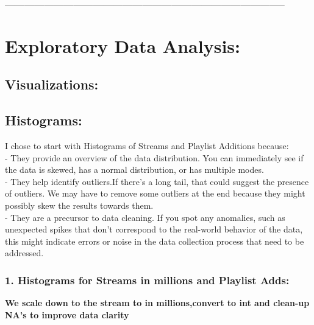 \documentclass[
]{article}
\newenvironment{Shaded}{\begin{snugshade}}{\end{snugshade}}
\newcommand{\FunctionTok}[1]{\textcolor[rgb]{0.13,0.29,0.53}{\textbf{#1}}}
\newcommand{\NormalTok}[1]{#1}
\newcommand{\OtherTok}[1]{\textcolor[rgb]{0.56,0.35,0.01}{#1}}
\newcommand{\SpecialCharTok}[1]{\textcolor[rgb]{0.81,0.36,0.00}{\textbf{#1}}}
\begin{document}
\textbf{--------------------------------------------------------------------------------------}

\hypertarget{exploratory-data-analysis}{%
\section{Exploratory Data Analysis:}\label{exploratory-data-analysis}}

\hypertarget{visualizations}{%
\subsection{Visualizations:}\label{visualizations}}

\hypertarget{histograms}{%
\subsection{Histograms:}\label{histograms}}

I chose to start with Histograms of Streams and Playlist Additions
because:\\
- They provide an overview of the data distribution. You can immediately
see if the data is skewed, has a normal distribution, or has multiple
modes.\\
- They help identify outliers.If there's a long tail, that could suggest
the presence of outliers. We may have to remove some outliers at the end
because they might possibly skew the results towards them.\\
- They are a precursor to data cleaning. If you spot any anomalies, such
as unexpected spikes that don't correspond to the real-world behavior of
the data, this might indicate errors or noise in the data collection
process that need to be addressed.

\hypertarget{histograms-for-streams-in-millions-and-playlist-adds}{%
\subsubsection{1. Histograms for Streams in millions and Playlist
Adds:}\label{histograms-for-streams-in-millions-and-playlist-adds}}

\textbf{We scale down to the stream to in millions,convert to int and
clean-up NA's to improve data clarity}

\begin{Shaded}
\end{Shaded}
\end{document}

